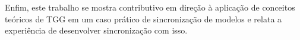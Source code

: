 \documentclass[cic,resumo-unibral]{iiufrgs}
\begin{document}
\begin{extendedsummary}
Enfim, este trabalho se mostra contributivo em direção à aplicação de conceitos teóricos de TGG em um caso prático de sincronização de modelos e relata a experiência de desenvolver sincronização com isso.



%




\end{extendedsummary}
\end{document}
